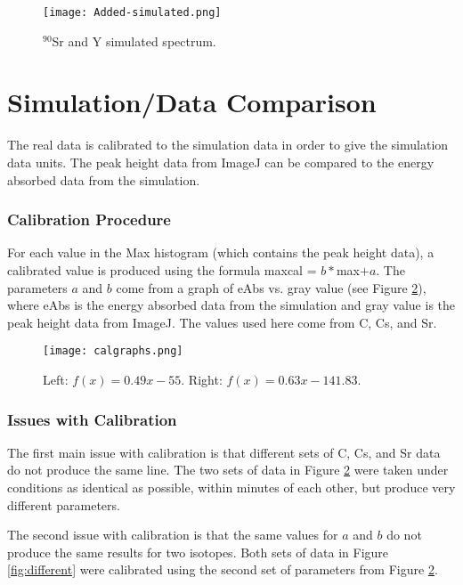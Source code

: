 \documentclass[a4paper,10pt]{article}
\begin{document}
\begin{figure}[!htbp]
	\centering
	\texttt{[image: Added-simulated.png]}
	\caption{$^{90}$Sr and Y simulated spectrum.}
	\label{fig:SrYsim}
\end{figure}


\part{Simulation/Data Comparison}

The real data is calibrated to the simulation data in order to give the simulation data units. The peak height data from ImageJ can be compared to the energy absorbed data from the simulation. 

\section{Calibration Procedure}

For each value in the Max histogram (which contains the peak height data), a calibrated value is produced using the formula maxcal = $b*$max$+a$. The parameters $a$ and $b$ come from a graph of eAbs vs. gray value (see Figure \ref{fig:calgraphs}), where eAbs is the energy absorbed data from the simulation and gray value is the peak height data from ImageJ. The values used here come from C, Cs, and Sr.

\begin{figure}[!htbp]
	\centering
	\texttt{[image: calgraphs.png]}
	\caption{Left: $f(x) = 0.49x-55$. Right: $f(x) = 0.63x-141.83$.}
	\label{fig:calgraphs}
\end{figure}

\section{Issues with Calibration}

The first main issue with calibration is that different sets of C, Cs, and Sr data do not produce the same line. The two sets of data in Figure \ref{fig:calgraphs} were taken under conditions as identical as possible, within minutes of each other, but produce very different parameters. 

The second issue with calibration is that the same values for $a$ and $b$ do not produce the same results for two isotopes. Both sets of data in Figure \ref{fig:different} were calibrated using the second set of parameters from Figure \ref{fig:calgraphs}.
\end{document}
